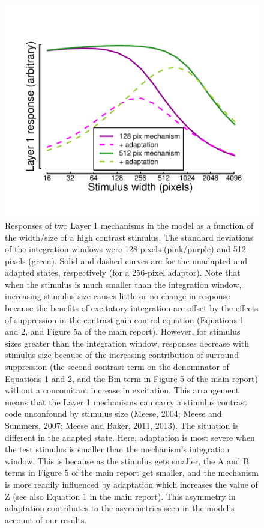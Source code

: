\documentclass[
]{article}
\begin{document}
\begin{figure}
\centering
\includegraphics{Figures/FigureS4.pdf}
\caption{\label{fig:figureS4}Responses of two Layer 1 mechanisms in the model as a function of the width/size of a high contrast stimulus. The standard deviations of the integration windows were 128 pixels (pink/purple) and 512 pixels (green). Solid and dashed curves are for the unadapted and adapted states, respectively (for a 256-pixel adaptor). Note that when the stimulus is much smaller than the integration window, increasing stimulus size causes little or no change in response because the benefits of excitatory integration are offset by the effects of suppression in the contrast gain control equation (Equations 1 and 2, and Figure 5a of the main report). However, for stimulus sizes greater than the integration window, responses decrease with stimulus size because of the increasing contribution of surround suppression (the second contrast term on the denominator of Equations 1 and 2, and the Bm term in Figure 5 of the main report) without a concomitant increase in excitation. This arrangement means that the Layer 1 mechanisms can carry a stimulus contrast code unconfound by stimulus size (Meese, 2004; Meese and Summers, 2007; Meese and Baker, 2011, 2013). The situation is different in the adapted state. Here, adaptation is most severe when the test stimulus is smaller than the mechanism's integration window. This is because as the stimulus gets smaller, the A and B terms in Figure 5 of the main report get smaller, and the mechanism is more readily influenced by adaptation which increases the value of Z (see also Equation 1 in the main report). This asymmetry in adaptation contributes to the asymmetries seen in the model's account of our results.}
\end{figure}
\end{document}
